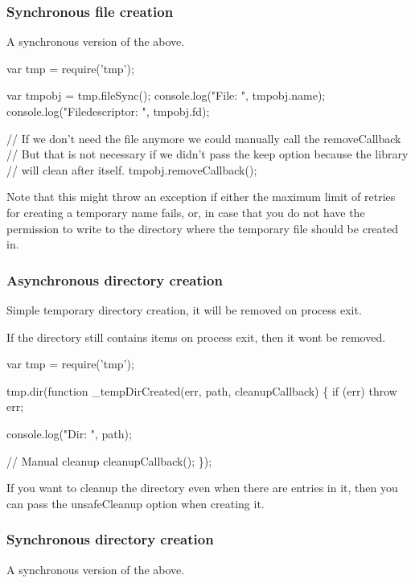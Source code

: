 \subsubsection*{Synchronous file creation}

A synchronous version of the above.


\begin{DoxyCode}
var tmp = require('tmp');

var tmpobj = tmp.fileSync();
console.log("File: ", tmpobj.name);
console.log("Filedescriptor: ", tmpobj.fd);

// If we don't need the file anymore we could manually call the removeCallback
// But that is not necessary if we didn't pass the keep option because the library
// will clean after itself.
tmpobj.removeCallback();
\end{DoxyCode}


Note that this might throw an exception if either the maximum limit of retries for creating a temporary name fails, or, in case that you do not have the permission to write to the directory where the temporary file should be created in.

\subsubsection*{Asynchronous directory creation}

Simple temporary directory creation, it will be removed on process exit.

If the directory still contains items on process exit, then it won\textquotesingle{}t be removed.


\begin{DoxyCode}
var tmp = require('tmp');

tmp.dir(function \_tempDirCreated(err, path, cleanupCallback) \{
  if (err) throw err;

  console.log("Dir: ", path);

  // Manual cleanup
  cleanupCallback();
\});
\end{DoxyCode}


If you want to cleanup the directory even when there are entries in it, then you can pass the {\ttfamily unsafe\+Cleanup} option when creating it.

\subsubsection*{Synchronous directory creation}

A synchronous version of the above.


